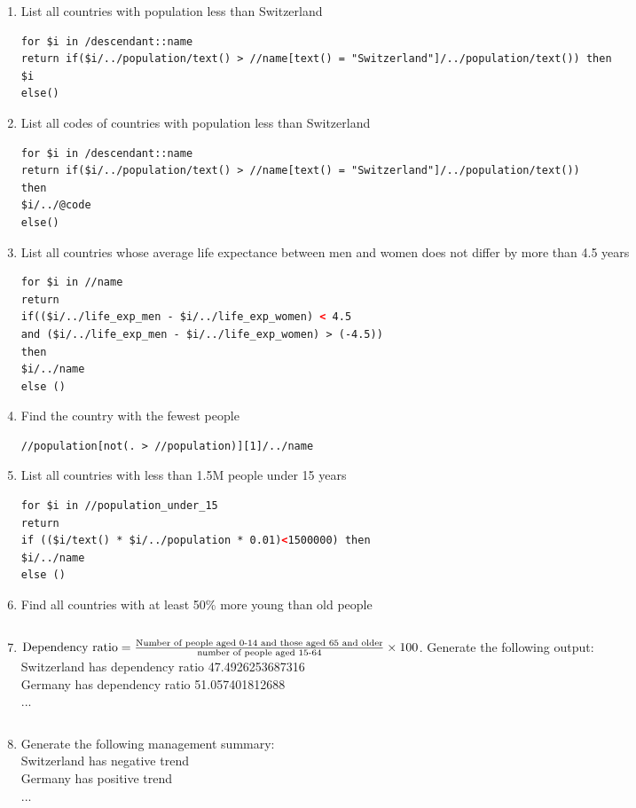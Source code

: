 \begin{enumerate}
\item List all countries with population less than Switzerland
\begin{lstlisting}[language=XML]
for $i in /descendant::name
return if($i/../population/text() > //name[text() = "Switzerland"]/../population/text()) then
$i
else()
\end{lstlisting}

\item List all codes of countries with population less than Switzerland
\begin{lstlisting}[language=XML]
for $i in /descendant::name
return if($i/../population/text() > //name[text() = "Switzerland"]/../population/text())
then
$i/../@code
else()
\end{lstlisting}

\item List all countries whose average life expectance between men and women does not differ by more than 4.5 years
\begin{lstlisting}[language=XML]
for $i in //name
return
if(($i/../life_exp_men - $i/../life_exp_women) < 4.5
and ($i/../life_exp_men - $i/../life_exp_women) > (-4.5))
then
$i/../name
else ()
\end{lstlisting}

\item Find the country with the fewest people
\begin{lstlisting}[language=XML]
//population[not(. > //population)][1]/../name
\end{lstlisting}

\item List all countries with less than 1.5M people under 15 years
\begin{lstlisting}[language=XML]
for $i in //population_under_15
return
if (($i/text() * $i/../population * 0.01)<1500000) then
$i/../name
else ()
\end{lstlisting}

\item Find all countries with at least 50\% more young than old people
\begin{lstlisting}[language=XML]
\end{lstlisting}

\item $\textnormal{Dependency ratio}=\frac{\textnormal{Number of people aged 0-14 and those aged 65 and older}}{\textnormal{number of people aged 15-64}}\times 100$. Generate the following output:\\
Switzerland has dependency ratio 47.4926253687316 \\
Germany has dependency ratio 51.057401812688\\...
\begin{lstlisting}[language=XML]
\end{lstlisting}

\item Generate the following management summary:\\
Switzerland has negative trend\\
Germany has positive trend\\...
\begin{lstlisting}[language=XML]
\end{lstlisting}
\end{enumerate}
